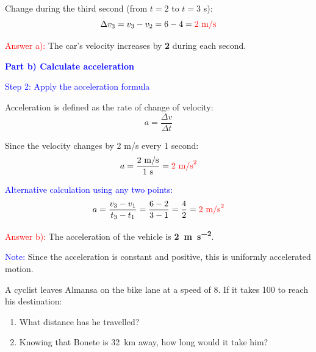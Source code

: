 \begin{exercise}
\begin{solu}
        Change during the third second (from $t=2$ to $t=3$ s):
        \[
            \Delta v_3 = v_3 - v_2 = 6 - 4 = \textcolor{red}{2 \text{ m/s}}
        \]

        \textcolor{red}{Answer a):} The car's velocity increases by \textbf{\qty{2}{\mps}} during each second.

        \vspace{0.5cm}

        \textbf{\textcolor{blue}{Part b) Calculate acceleration}}

        \textcolor{blue}{Step 2: Apply the acceleration formula}

        Acceleration is defined as the rate of change of velocity:
        \[
            \boxed{a = \frac{\Delta v}{\Delta t}}
        \]

        Since the velocity changes by 2 m/s every 1 second:
        \[
            a = \frac{2 \text{ m/s}}{1 \text{ s}} = \textcolor{red}{2 \text{ m/s}^2}
        \]

        \textcolor{blue}{Alternative calculation using any two points:}
        \[
            a = \frac{v_3 - v_1}{t_3 - t_1} = \frac{6 - 2}{3 - 1} = \frac{4}{2} = \textcolor{red}{2 \text{ m/s}^2}
        \]

        \textcolor{red}{Answer b):} The acceleration of the vehicle is \textbf{\qty{2}{\metre\per\second\squared}}.

        \textcolor{blue}{Note:} Since the acceleration is constant and positive, this is uniformly accelerated motion.
    \end{solu}
\end{exercise}

\begin{exercise}
    A cyclist leaves Almansa on the bike lane at a speed of \qty{8}{\mps}.
    If it takes \qty{100}{\min} to reach his destination:
    \begin{enumerate}[label=\letraminuscula]
    \item What distance has he travelled?
    \item Knowing that Bonete is \qty{32}{\km} away, how long would it take him?
    \end{enumerate}
\end{exercise}


